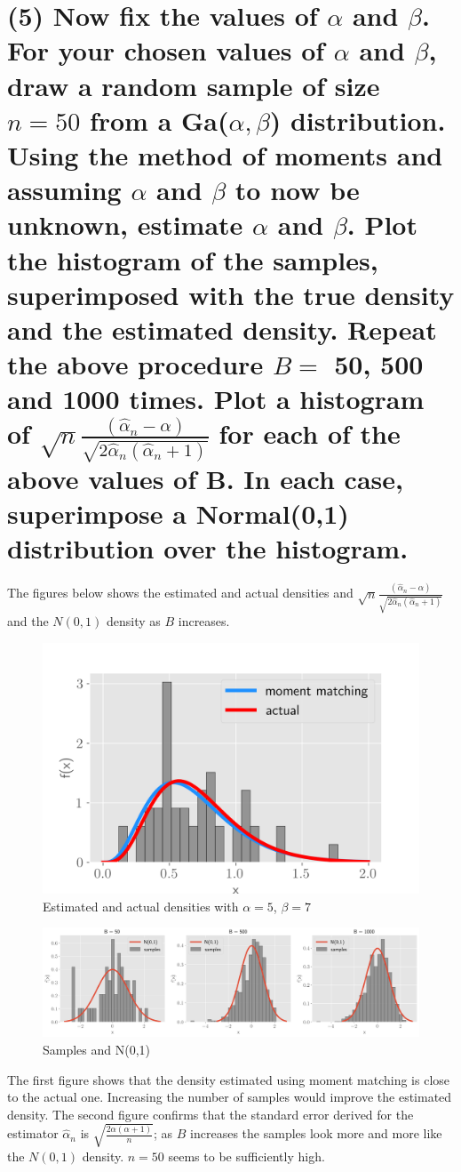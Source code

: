 \documentclass[11pt]{article}
\begin{document}
\section*{(5) Now fix the values of $\alpha$ and $\beta$. For your chosen values of $\alpha$ and $\beta$, draw a random sample of size $n=50$ from a Ga($\alpha, \beta$) distribution. Using the method of moments and assuming $\alpha$ and $\beta$ to now be unknown, estimate $\alpha$ and $\beta$. Plot the histogram of the samples, superimposed with the true density and the estimated density. Repeat the above procedure $B = $ 50, 500 and 1000 times. Plot a histogram of $\sqrt{n}\frac{(\hat{\alpha}_n - \alpha)}{\sqrt{2\hat{\alpha}_n(\hat{\alpha}_n+1)}}$ for each of the above values of B. In each case, superimpose a Normal(0,1) distribution over the histogram.}
 
The figures below shows the estimated and actual densities and $\sqrt{n}\frac{(\hat{\alpha}_n - \alpha)}{\sqrt{2\hat{\alpha}_n(\hat{\alpha}_n+1)}}$ and the $N(0, 1)$ density as $B$ increases.


\begin{figure}[!h]
    \centering
    \includegraphics[scale=.7]{homework_1/first_hist.png}
    \caption{Estimated and actual densities with $\alpha = 5$, $\beta = 7$}
    \label{fig:my_label}
\end{figure}


\begin{figure}[!h]
    \centering
    \includegraphics[scale=.35]{homework_1/second_hist.png}
    \caption{Samples and N(0,1)}
    \label{fig:my_label}
\end{figure}
\newpage
The first figure shows that the density estimated using moment matching is close to the actual one. Increasing the number of samples would improve the estimated density. The second figure confirms that the standard error derived for the estimator $\hat{\alpha}_n$ is $\sqrt{\frac{2\alpha(\alpha+1)}{n}}$; as $B$ increases the samples look more and more like the $N(0,1)$ density. $n = 50$ seems to be sufficiently high.
\end{document}
